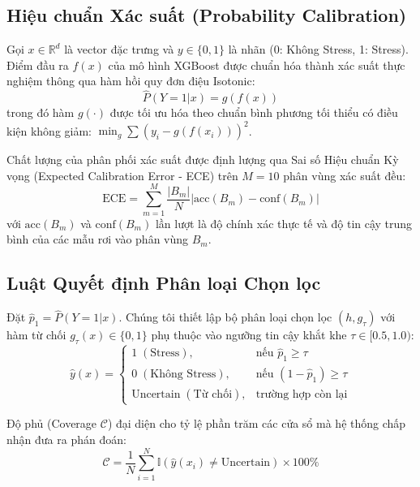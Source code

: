 \documentclass[conference]{IEEEtran}
\begin{document}
\subsection{Hiệu chuẩn Xác suất (Probability Calibration)}
Gọi $x \in \mathbb{R}^d$ là vector đặc trưng và $y \in \{0, 1\}$ là nhãn (0: Không Stress, 1: Stress). Điểm đầu ra $f(x)$ của mô hình XGBoost được chuẩn hóa thành xác suất thực nghiệm thông qua hàm hồi quy đơn điệu Isotonic:
\begin{equation}
\hat{P}(Y=1|x) = g(f(x))
\end{equation}
trong đó hàm $g(\cdot)$ được tối ưu hóa theo chuẩn bình phương tối thiểu có điều kiện không giảm: $\min_g \sum (y_i - g(f(x_i)))^2$.

Chất lượng của phân phối xác suất được định lượng qua Sai số Hiệu chuẩn Kỳ vọng (Expected Calibration Error - ECE) trên $M=10$ phân vùng xác suất đều:
\begin{equation}
\text{ECE} = \sum_{m=1}^M \frac{|B_m|}{N} \left| \text{acc}(B_m) - \text{conf}(B_m) \right|
\end{equation}
với $\text{acc}(B_m)$ và $\text{conf}(B_m)$ lần lượt là độ chính xác thực tế và độ tin cậy trung bình của các mẫu rơi vào phân vùng $B_m$.

\subsection{Luật Quyết định Phân loại Chọn lọc}
Đặt $\hat{p}_1 = \hat{P}(Y=1|x)$. Chúng tôi thiết lập bộ phân loại chọn lọc $(h, g_\tau)$ với hàm từ chối $g_\tau(x) \in \{0, 1\}$ phụ thuộc vào ngưỡng tin cậy khắt khe $\tau \in [0.5, 1.0)$:
\begin{equation}
\hat{y}(x) = 
\begin{cases} 
1 \; (\text{Stress}), & \text{nếu } \hat{p}_1 \ge \tau \\
0 \; (\text{Không Stress}), & \text{nếu } (1 - \hat{p}_1) \ge \tau \\
\text{Uncertain} \; (\text{Từ chối}), & \text{trường hợp còn lại}
\end{cases}
\end{equation}

Độ phủ (Coverage $\mathcal{C}$) đại diện cho tỷ lệ phần trăm các cửa sổ mà hệ thống chấp nhận đưa ra phán đoán:
\begin{equation}
\mathcal{C} = \frac{1}{N} \sum_{i=1}^N \mathbb{I}(\hat{y}(x_i) \neq \text{Uncertain}) \times 100\%
\end{equation}
\end{document}
